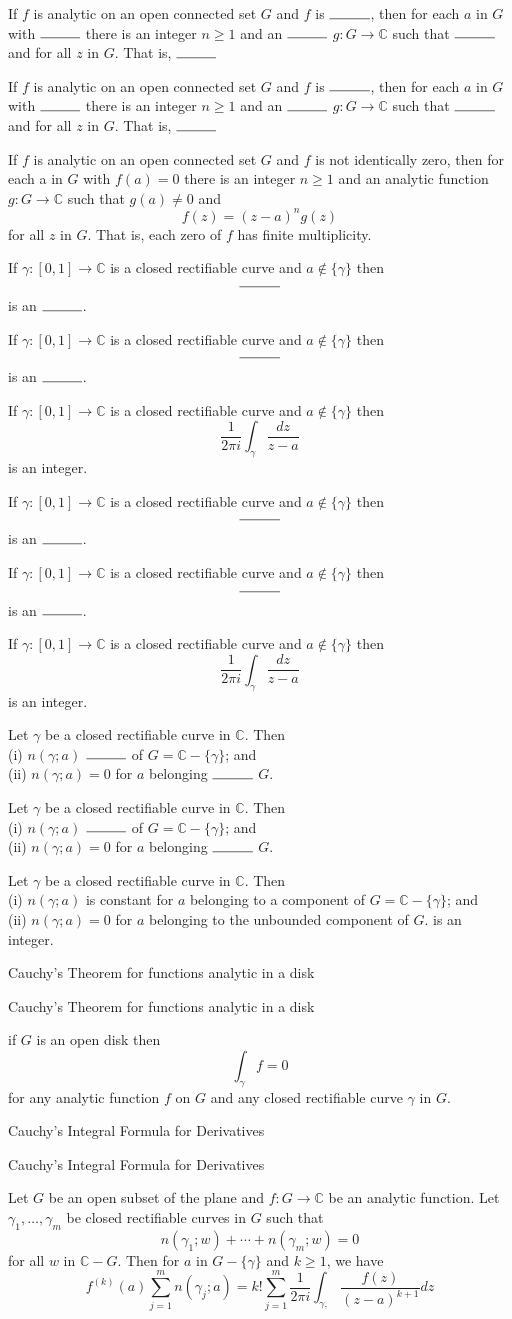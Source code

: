 \documentclass[17pt]{extarticle}
\newcommand{\boxset}[2]{\begin{mdframed}[style=darkQuesion]
#1
\end{mdframed}
\newpage
\begin{mdframed}[style=darkQuesion]
  #1
    \end{mdframed}
\begin{mdframed}[style=darkAnswer]
  #2
    \end{mdframed}
    \newpage
}
\begin{document}
\boxset{
If $f$ is analytic on an open connected set $G$ and $f$ is $\rule{1cm}{0.15mm}$,
then for each $a$ in $G$ with $\rule{1cm}{0.15mm}$ there is an integer $n \geq 1$ and
an $\rule{1cm}{0.15mm}$ $g: G \rightarrow \mathbb{C}$ such that $\rule{1cm}{0.15mm}$ and
for all $z$ in $G$. That is, $\rule{1cm}{0.15mm}$
}
{ If $f$ is analytic on an open connected set $G$ and $f$ is not identically zero, then for each a in $G$ with $f(a)=0$ there is an integer $n \geq 1$ and an analytic function $g: G \rightarrow \mathbb{C}$ such that $g(a) \neq 0$ and
\[f(z)=(z-a)^{n} g(z)\]
for all $z$ in $G$. That is, each zero of $f$ has finite multiplicity.}
\boxset{ If $\gamma:[0,1] \rightarrow \mathbb{C}$ is a closed rectifiable curve and $a \notin\{\gamma\}$ then
\[\rule{1cm}{0.15mm}\]
is an $\rule{1cm}{0.15mm}$.}{ If $\gamma:[0,1] \rightarrow \mathbb{C}$ is a closed rectifiable curve and $a \notin\{\gamma\}$ then
\[\frac{1}{2 \pi i} \int_{\gamma} \frac{d z}{z-a}\]
is an integer.}
\boxset{ If $\gamma:[0,1] \rightarrow \mathbb{C}$ is a closed rectifiable curve and $a \notin\{\gamma\}$ then
\[\rule{1cm}{0.15mm}\]
is an $\rule{1cm}{0.15mm}$.}{ If $\gamma:[0,1] \rightarrow \mathbb{C}$ is a closed rectifiable curve and $a \notin\{\gamma\}$ then
\[\frac{1}{2 \pi i} \int_{\gamma} \frac{d z}{z-a}\]
is an integer.}
\boxset{  Let $\gamma$ be a closed rectifiable curve in $\mathbb{C}$. Then\\
(i) $n(\gamma ; a)$ $\rule{1cm}{0.15mm}$ of $G=\mathbb{C}-\{\gamma\}$; and\\
(ii) $n(\gamma ; a)=0$ for $a$ belonging $\rule{1cm}{0.15mm}$ $G$.}
{ Let $\gamma$ be a closed rectifiable curve in $\mathbb{C}$. Then\\
(i) $n(\gamma ; a)$ is constant for $a$ belonging to a component of $G=\mathbb{C}-\{\gamma\}$; and\\
(ii) $n(\gamma ; a)=0$ for $a$ belonging to the unbounded component of $G$.
is an integer.}
\boxset{Cauchy's Theorem for functions analytic in a disk}
{if $G$ is an open disk then
\[\int_{\gamma} f=0\]
for any analytic function $f$ on $G$ and any closed rectifiable curve $\gamma$ in $G$.}
\boxset{Cauchy's Integral Formula for Derivatives}
{Let $G$ be an open subset of the plane and $f: G \rightarrow \mathbb{C}$ be an analytic function. Let $\gamma_{1}, \ldots, \gamma_{m}$ be closed rectifiable curves in $G$ such that
\[n\left(\gamma_{1} ; w\right)+\cdots+n\left(\gamma_{m} ; w\right)=0\]
for all $w$ in $\mathbb{C}-G$. Then for $a$ in $G-\{\gamma\}$ and $k \geq 1$, we have
\[f^{(k)}(a) \sum_{j=1}^{m} n\left(\gamma_{j} ; a\right)=k ! \sum_{j=1}^{m} \frac{1}{2 \pi i} \int_{\gamma,} \frac{f(z)}{(z-a)^{k+1}} d z\]}
\end{document}
